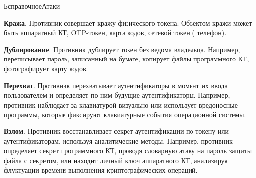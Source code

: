 \begin{appendix}{Б}{справочное}{Атаки}
\label{ATK.TI}

{\bf Кража}. 
Противник совершает кражу физического токена.
Объектом кражи может быть аппаратный КТ, OTP-токен, карта кодов, 
сетевой токен ( телефон).


%

{\bf Дублирование}. 
Противник дублирует токен без ведома владельца.
%
Например, переписывает пароль, записанный на бумаге,
копирует файлы программного КТ, фотографирует карту кодов.


{\bf Перехват}. 
Противник перехватывает аутентификаторы
в момент их ввода пользователем и определяет по ним будущие аутентификаторы.
%
Например, противник наблюдает за клавиатурой визуально или использует 
вредоносные программы, которые фиксируют клавиатурные события 
операционной системы. 


{\bf Взлом}. 
Противник восстанавливает секрет аутентификации по токену или 
аутентификаторам, используя аналитические методы.
%
Например, противник определяет секрет программного КТ,
проводя словарную атаку на пароль защиты файла с секретом,
или находит личный ключ аппаратного КТ, анализируя флуктуации времени 
выполнения криптографических операций. 



\end{appendix}
